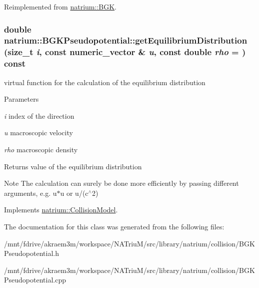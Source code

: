 Reimplemented from \hyperlink{classnatrium_1_1BGK_ae5e97a4995fe927e9042a6cffac80acc}{natrium::BGK}.\hypertarget{classnatrium_1_1BGKPseudopotential_a63ce98e44a07466963fb123cac9dd905}{
\subsubsection[{getEquilibriumDistribution}]{\setlength{\rightskip}{0pt plus 5cm}double natrium::BGKPseudopotential::getEquilibriumDistribution (size\_\-t {\em i}, \/  const numeric\_\-vector \& {\em u}, \/  const double {\em rho} = {}) const}}
\label{classnatrium_1_1BGKPseudopotential_a63ce98e44a07466963fb123cac9dd905}


virtual function for the calculation of the equilibrium distribution 
\begin{DoxyParams}{Parameters}
\item[{\em i}]index of the direction \item[{\em u}]macroscopic velocity \item[{\em rho}]macroscopic density \end{DoxyParams}
\begin{DoxyReturn}{Returns}
value of the equilibrium distribution 
\end{DoxyReturn}
\begin{DoxyNote}{Note}
The calculation can surely be done more efficiently by passing different arguments, e.g. u$\ast$u or u/(c$^\wedge$2) 
\end{DoxyNote}


Implements \hyperlink{classnatrium_1_1CollisionModel_a88b382d63da80e950bc58e8afad769a6}{natrium::CollisionModel}.

The documentation for this class was generated from the following files:\begin{DoxyCompactItemize}
\item 
/mnt/fdrive/akraem3m/workspace/NATriuM/src/library/natrium/collision/BGKPseudopotential.h\item 
/mnt/fdrive/akraem3m/workspace/NATriuM/src/library/natrium/collision/BGKPseudopotential.cpp\end{DoxyCompactItemize}

